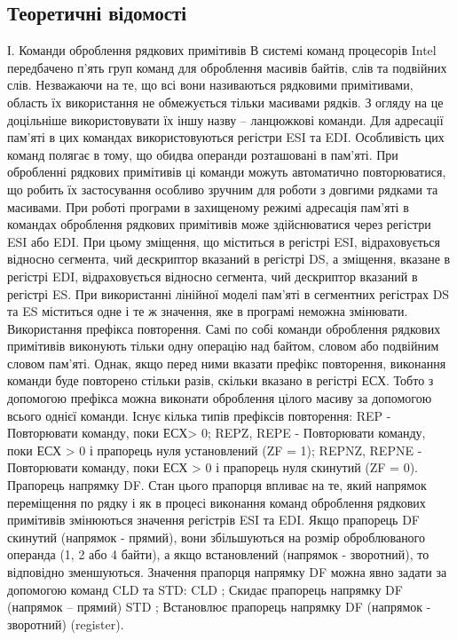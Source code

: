 \documentclass[12pt]{extarticle}
\begin{document}
\subsection*{Теоретичні відомості}
І. Команди оброблення рядкових примітивів
В системі команд процесорів Intel передбачено п'ять груп команд для
оброблення масивів байтів, слів та подвійних слів. Незважаючи на те, що всі вони
називаються рядковими примітивами, область їх використання не обмежується
тільки масивами рядків. З огляду на це доцільніше використовувати їх іншу
назву – ланцюжкові команди.
Для адресації пам'яті в цих командах використовуються регістри ESI та
EDI. Особливість цих команд полягає в тому, що обидва операнди розташовані
в пам'яті. При обробленні рядкових примітивів ці команди можуть автоматично
повторюватися, що робить їх застосування особливо зручним для роботи з
довгими рядками та масивами.
При роботі програми в захищеному режимі адресація пам'яті в командах
оброблення рядкових примітивів може здійснюватися через регістри ESI або
EDI. При цьому зміщення, що міститься в регістрі ESI, відраховується відносно
сегмента, чий дескриптор вказаний в регістрі DS, а зміщення, вказане в регістрі
EDI, відраховується відносно сегмента, чий дескриптор вказаний в регістрі ES.
При використанні лінійної моделі пам'яті в сегментних регістрах DS та ES
міститься одне і те ж значення, яке в програмі неможна змінювати.
Використання префікса повторення. Самі по собі команди оброблення
рядкових примітивів виконують тільки одну операцію над байтом, словом або
подвійним словом пам'яті. Однак, якщо перед ними вказати префікс повторення,
виконання команди буде повторено стільки разів, скільки вказано в регістрі ЕСХ.
Тобто з допомогою префікса можна виконати оброблення цілого масиву за
допомогою всього однієї команди. Існує кілька типів префіксів повторення:
REP - Повторювати команду, поки ЕСХ> 0;
REPZ, REPE - Повторювати команду, поки ЕСХ > 0 і прапорець нуля
установлений (ZF = 1);
REPNZ, REPNE - Повторювати команду, поки ЕСХ > 0 і прапорець нуля
скинутий (ZF = 0).
Прапорець напрямку DF. Стан цього прапорця впливає на те, який
напрямок переміщення по рядку і як в процесі виконання команд оброблення
рядкових примітивів змінюються значення регістрів ESI та EDI. Якщо прапорець
DF скинутий (напрямок - прямий), вони збільшуються на розмір оброблюваного 
операнда (1, 2 або 4 байти), а якщо встановлений (напрямок - зворотний), то
відповідно зменшуються.
Значення прапорця напрямку DF можна явно задати за допомогою команд
CLD та STD:
CLD ; Скидає прапорець напрямку DF (напрямок – прямий)
STD ; Встановлює прапорець напрямку DF (напрямок - зворотний)
(register).
\end{document}

